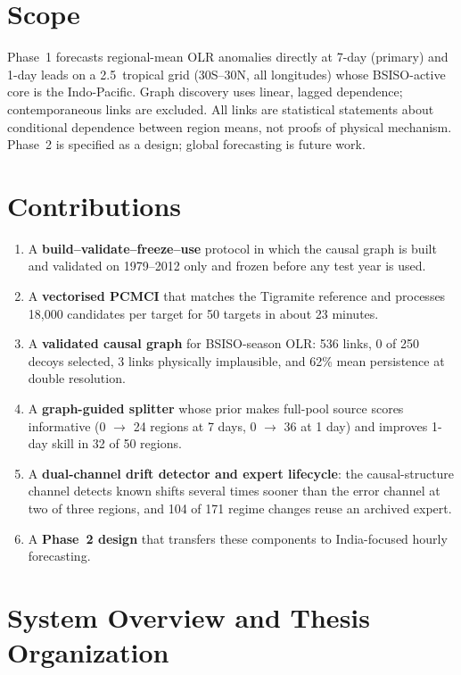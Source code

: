 \section{Scope}
\label{sec:intro-scope}

Phase~1 forecasts regional-mean OLR anomalies directly at 7-day (primary) and 1-day leads on a 2.5\dg\ tropical grid (30\dg S--30\dg N, all longitudes) whose BSISO-active core is the Indo-Pacific. Graph discovery uses linear, lagged dependence; contemporaneous links are excluded. All links are statistical statements about conditional dependence between region means, not proofs of physical mechanism. Phase~2 is specified as a design; global forecasting is future work.

\section{Contributions}
\label{sec:intro-contrib}

\begin{enumerate}
  \item A \textbf{build--validate--freeze--use} protocol in which the causal graph is built and validated on 1979--2012 only and frozen before any test year is used.
  \item A \textbf{vectorised PCMCI} that matches the Tigramite reference and processes 18{,}000 candidates per target for 50 targets in about 23 minutes.
  \item A \textbf{validated causal graph} for BSISO-season OLR: 536 links, 0 of 250 decoys selected, 3 links physically implausible, and 62\% mean persistence at double resolution.
  \item A \textbf{graph-guided splitter} whose prior makes full-pool source scores informative (0 $\to$ 24 regions at 7 days, 0 $\to$ 36 at 1 day) and improves 1-day skill in 32 of 50 regions.
  \item A \textbf{dual-channel drift detector and expert lifecycle}: the causal-structure channel detects known shifts several times sooner than the error channel at two of three regions, and 104 of 171 regime changes reuse an archived expert.
  \item A \textbf{Phase~2 design} that transfers these components to India-focused hourly forecasting.
\end{enumerate}

\section{System Overview and Thesis Organization}
\label{sec:intro-org}

